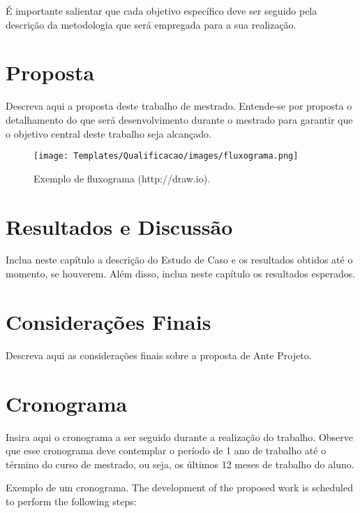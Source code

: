 \documentclass[11pt]{article}
\begin{document}
É importante salientar que cada objetivo específico deve ser seguido pela descrição da metodologia que será empregada para a sua realização.

\section{Proposta} \label{ch:metodologia}

Descreva aqui a proposta deste trabalho de mestrado. Entende-se por proposta o detalhamento do que será desenvolvimento durante o mestrado para garantir que o objetivo central deste trabalho seja alcançado.

\begin{figure}[!htb]
 \centering
 \texttt{[image: Templates/Qualificacao/images/fluxograma.png]}
 \caption{\label{fig:fluxograma}Exemplo de fluxograma (http://draw.io).}
\end{figure}

\section{Resultados e Discussão} \label{ch:simulacoes}

Inclua neste capítulo a descrição do Estudo de Caso e os resultados obtidos até o momento, se houverem. Além disso, inclua neste capítulo os resultados esperados. 



\section{Considerações Finais} \label{ch:consideracoes}

Descreva aqui as considerações finais sobre a proposta de Ante Projeto.  

\section{Cronograma} \label{ch:cronograma}

Insira aqui o cronograma a ser seguido durante a realização do trabalho. Observe que esse cronograma deve contemplar o período de 1 ano de trabalho até o término do curso de mestrado, ou seja, os últimos 12 meses de trabalho do aluno.

Exemplo de um cronograma.
The development of the proposed work is scheduled to perform the following steps:
\end{document}
